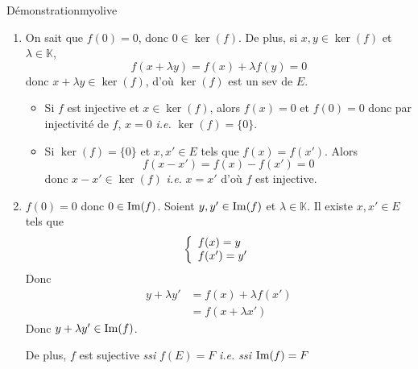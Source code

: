     \begin{demo}{Démonstration}{myolive}
        \begin{enumerate}
            \item On sait que $f(0) = 0$, donc $0 \in \ker(f)$. De plus, si $x,y \in \ker(f)$ et $\lambda \in \mathbb{K}$, 
            \[ f(x+\lambda y) = f(x) + \lambda f(y) = 0 \]   
            donc $x + \lambda y \in \ker(f)$, d’où $\ker(f)$ est un sev de $E$.

            \begin{itemize}
                \item Si $f$ est injective et $x \in \ker(f)$, alors $f(x) = 0$ et $f(0) = 0$ donc par injectivité de $f$, $x = 0$ \textit{i.e.} $\ker(f) = \{0\}$.
                \item Si $\ker(f) = \{0\}$ et $x,x' \in E$ tels que $f(x) = f(x')$. Alors 
                \[ f(x - x') = f(x) - f(x') = 0 \]   
                donc $x - x' \in \ker(f)$ \textit{i.e.} $x = x'$ d’où $f$ est injective.
            \end{itemize}
            \item $f(0) = 0$ donc $0 \in \operatorname{Im}(f)$. Soient $y,y' \in \operatorname{Im}(f)$ et $\lambda \in \mathbb{K}$. Il existe $x, x' \in E$ tels que 
            \[ \et{f(x) = y}{f(x') = y'} \]
            Donc 
            \begin{align*}
                y + \lambda y' 
                &= f(x) + \lambda f(x') \\
                &= f(x + \lambda x')
            \end{align*}
            Donc $y + \lambda y' \in \operatorname{Im}(f)$.

            De plus, $f$ est sujective \textit{ssi} $f(E) = F$ \textit{i.e. ssi} $\operatorname{Im}(f) = F$
        \end{enumerate}
    \end{demo}

